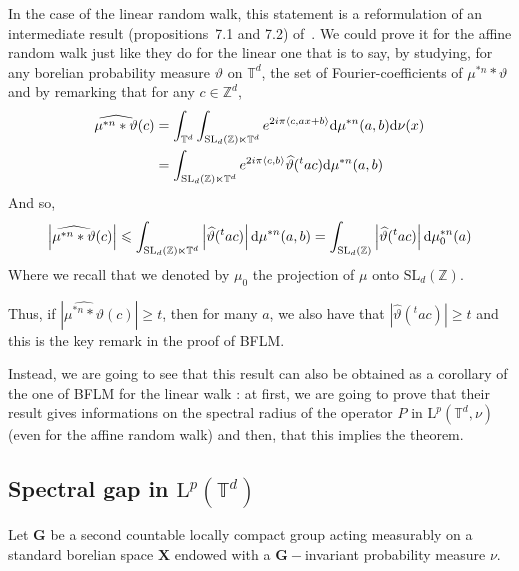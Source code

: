 \documentclass[11pt]{amsart}
\theoremstyle{definition}
\theoremstyle{remark}
\numberwithin{equation}{section}
\begin{document}
In the case of the linear random walk, this statement is a reformulation of an intermediate result (propositions~7.1 and 7.2) of~\cite{BFLM11}. We could prove it for the affine random walk just like they do for the linear one that is to say, by studying, for any borelian probability measure $\vartheta$ on ${\mathbb T}^d$, the set of Fourier-coefficients of $\mu^{\ast n}\ast \vartheta$ and  by remarking that for any $c\in {\mathbb Z}^d$,
\begin{align*}
\widehat{\mu^{\ast n} \ast \vartheta}(c) &= \int_{{\mathbb T}^d}\int_{\mathrm{SL}_d({\mathbb Z}) \ltimes {\mathbb T}^d} e^{2i\pi \langle c,ax+b \rangle} {{\rm d}}\mu^{\ast n}(a,b) {{\rm d}}\nu(x) \\
&= \int_{\mathrm{SL}_d({\mathbb Z}) \ltimes {\mathbb T}^d} e^{2i\pi \langle c,b\rangle} \widehat \vartheta(^t ac) {{\rm d}}\mu^{\ast n}(a,b)
\end{align*}
And so,
\[
\left|\widehat{\mu^{\ast n} \ast \vartheta}(c) \right| \leqslant \int_{\mathrm{SL}_d({\mathbb Z}) \ltimes {\mathbb T}^d} \left|\widehat \vartheta(^t ac)\right| {{\rm d}}\mu^{\ast n}(a,b) = \int_{\mathrm{SL}_d({\mathbb Z})}  \left|\widehat \vartheta(^t ac)\right| {{\rm d}}\mu_0^{\ast n}(a)
\]
Where we recall that we denoted by $\mu_0$ the projection of $\mu$ onto $\mathrm{SL}_d({\mathbb Z})$.

Thus, if $\left|\widehat{\mu^{\ast n} \ast \vartheta}(c) \right| \geqslant t$, then for many $a$, we also have that $\left|\widehat \vartheta(^t ac)\right|\geqslant t$ and this is the key remark in the proof of BFLM.

\medskip
Instead, we are going to see that this result can also be obtained as a corollary of the one of BFLM for the linear walk : at first, we are going to prove that their result gives informations on the spectral radius of the operator $P$ in $\mathrm{L}^p({\mathbb T}^d,\nu)$ (even for the affine random walk) and then, that this implies the theorem.

\subsection{Spectral gap in \texorpdfstring{$\mathrm{L}^p({\mathbb T}^d)$}{LpTd}}

Let ${\mathbf G}$ be a second countable locally compact group acting measurably on a standard borelian space ${\mathbf X}$ endowed with a ${\mathbf G}-$invariant probability measure $\nu$.
\end{document}
